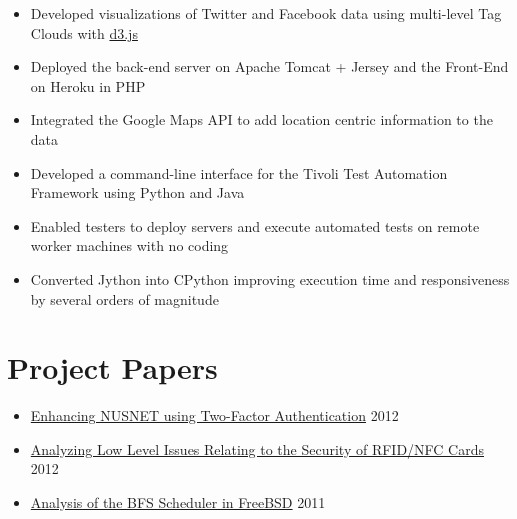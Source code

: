 \documentclass[11pt,a4paper]{moderncv}
\begin{document}
{\begin{itemize}
        \item Developed visualizations of Twitter and Facebook data using multi-level Tag Clouds with \href{http://d3js.org/}{d3.js}
        \item Deployed the back-end server on Apache Tomcat + Jersey and the Front-End on Heroku in PHP
        \item Integrated the Google Maps API to add location centric information to the data
 \end{itemize}}

{\begin{itemize}
        \item Developed a command-line interface for the Tivoli Test Automation Framework using Python and Java
        \item Enabled testers to deploy servers and execute automated tests on remote worker machines with no coding
        \item Converted Jython into CPython improving execution time and responsiveness by several orders of magnitude
 \end{itemize}}
\section{Project Papers}
\begin{itemize}
\item \href{https://github.com/vellvisher/papers_reports/raw/master/NUS_2FA_GA.pdf}{Enhancing NUSNET using Two-Factor Authentication} \hfill 2012
\item \href{https://github.com/vellvisher/papers_reports/raw/master/RFID_NFC.pdf}{Analyzing Low Level Issues Relating to the Security of RFID/NFC Cards} \hfill 2012
\item \href{https://github.com/vellvisher/papers_reports/raw/master/BFS_FreeBSD.pdf}{Analysis of the BFS Scheduler in FreeBSD} \hfill 2011
\end{itemize}
\end{document}
